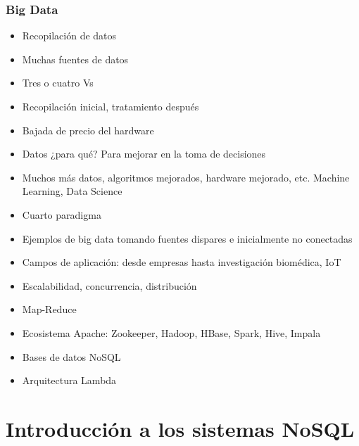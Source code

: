 \documentclass[14pt]{beamer}
\begin{document}
\begin{frame}[allowframebreaks]
  \frametitle{Big Data}
  \begin{itemize}
  \item Recopilación de datos
  \item Muchas fuentes de datos
  \item Tres o cuatro Vs
  \item Recopilación inicial, tratamiento después
  \item Bajada de precio del hardware
  \item Datos ¿para qué? Para mejorar en la toma de decisiones
  \item Muchos más datos, algoritmos mejorados, hardware mejorado, etc.
    Machine Learning, Data Science
  \item Cuarto paradigma
  \item Ejemplos de big data tomando fuentes dispares e inicialmente no
    conectadas
  \item Campos de aplicación: desde empresas hasta investigación biomédica,
    IoT
  \item Escalabilidad, concurrencia, distribución
  \item Map-Reduce
  \item Ecosistema Apache: Zookeeper, Hadoop, HBase, Spark, Hive, Impala
  \item Bases de datos NoSQL
  \item Arquitectura Lambda
  \end{itemize}
\end{frame}





\section{Introducción a los sistemas NoSQL}
\end{document}
